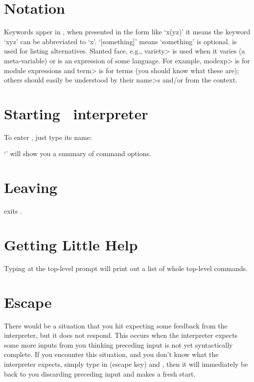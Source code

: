\documentclass[a4paper,oneside,twocolumn]{memoir}
\begin{document}
\midsloppy
\mainmatter



\section{Notation}

Keywords apper in ,
when presented in the form like `x(yz)' it means the keyword `xyz'
can be abbreviated to `x'.
`[something]' means `something' is optional.
\kbd{|} is used for listing alternatives.
Slanted face, e.g., \<variety> is used when it varies (a
meta-variable) or is an expression of some language. For example,
\<modexp> is for module expressions and \<term> is for terms (you
should know what these are); others should easily be understood by
their \<name>s and/or from the context. 
\section{Starting \hcafeobj\ interpreter}

To enter \cafeobj, just type its name: 

`' will show you a summary of command options. 

\section{Leaving \hcafeobj}

 exits \cafeobj.

\section{Getting Little Help}

Typing  at the top-level prompt will print out a list of whole
top-level commands.

\section{Escape}

There would be a situation that you hit  expecting some feedback from the interpreter, but it does not respond. 
This occurs when the interpreter expects some more inputs from you thinking
preceding input is not yet syntactically complete. If you encounter this situation, 
and you don't know what the interpreter expects, 
simply type in (escape key) and , then it will
immediately be back to you discarding preceding input
and makes a fresh start.
\end{document}
